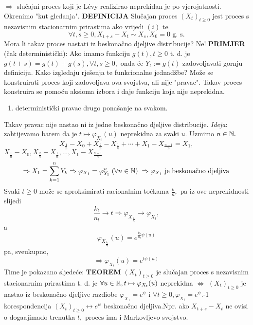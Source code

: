 \documentclass{article}
\begin{document}
\(\Rightarrow\) slučajni proces koji je L\'evy realizirao neprekidan je po vjerojatnosti.\newline\newline
Okrenimo "kut gledanja".\newline
\textbf{DEFINICIJA}\newline
Slučajan proces \((X_t)_{t\ge0}\) jest proces s nezavisnim stacionarnim prirastima ako vrijedi \((i)\) te \[\forall t,s\ge0,X_{t+s}-X_t\sim X_s, X_0=0\text{ g. s.}\]
Mora li takav proces nastati iz beskonačno djeljive distribucije? Ne!\newline\newline
\textbf{PRIMJER} (čak deterministički):\newline
Ako imamo funkciju \(g(t),t\ge0\) t. d. je \(g(t+s)=g(t)+g(s),\forall t,s\ge0,\) onda će \(Y_t:=g(t)\) zadovoljavati gornju definiciju.\newline\newline 
Kako izgledaju rješenja te funkcionalne jednadžbe? Može se konstruirati proces koji zadovoljava ova svojstva, ali nije "pravac". Takav proces konstruira se pomoću aksioma izbora i daje funkciju koja nije neprekidna.\begin{enumerate}
    \item[\ding{228}] deterministički pravac  drugo ponašanje na svakom. 
\end{enumerate} Takav pravac nije nastao ni iz jedne beskonačno djeljive distribucije.\newline\newline
\emph{Ideja}: zahtijevamo barem da je \(t\mapsto\varphi_{X_t}(u)\) neprekidna za svaki \(u.\) Uzmimo \(n\in\Bbb N.\) \[X_{\frac1n}-X_0+X_{\frac2n}-X_{\frac1n}+\cdots+X_1-X_{\frac{n-1}n}=X_1,\]\(X_{\frac1n}-X_0,X_{\frac2n}-X_{\frac1n},\ldots,X_1-X_{\frac{n-1}n}\) \[\Rightarrow X_1=\sum_{k=1}^nY_k\Rightarrow\varphi_{X_1}=\varphi_{Y_1}^n\;(\forall n\in\Bbb N)\;\Rightarrow\varphi_{X_1}\text{ je beskonačno djeljiva}\]
Svaki \(t\ge0\) može se aproksimirati racionalnim točkama \(\frac{k}n,\) pa iz ove neprekidnosti slijedi \[\frac{k_l}{n_l}\to t\Rightarrow\varphi_{X_{\frac{k_l}{n_l}}}\to\varphi_{X_t},\] a \[\varphi_{X_{\frac{k_l}{n_l}}}(u)=e^{\frac{k_l}{n_l}\psi(u)}\] pa, sveukupno, \[\Rightarrow\varphi_{X_t}(u)=e^{t\psi(u)}\]
Time je pokazano sljedeće:\newline
\textbf{TEOREM}\newline
\((X_t)_{t\ge0}\) je slučajan proces s nezavisnim stacionarnim prirastima t. d. je \(\forall u\in\Bbb R,t\mapsto\varphi_{X_t}(u)\) neprekidna \(\Leftrightarrow\) \((X_t)_{t\ge0}\) je nastao iz beskonačno djeljive razdiobe \(\varphi_{X_1}=e^\psi\) i \(\forall t\ge0,\varphi_{X_t}=e^\psi.\)\newline{}-1 korespondencija \((X_t)_{t\ge0}\leftrightarrow e^\psi\) beskonačno djeljiva.\newline Npr. ako \(X_{t+s}-X_t\) ne ovisi o doga\dj{}ajimado trenutka \(t,\) proces ima i Markovljevo svojstvo. 
\newpage
\end{document}
